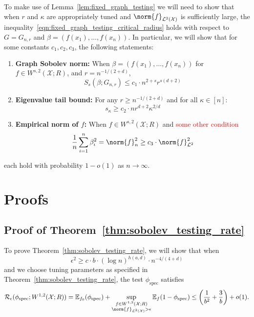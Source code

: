 \documentclass{article}
\newcommand{\1}{\mathbf{1}}
\newcommand{\Leb}{\mathcal{L}}
\newcommand{\Ebb}{\mathbb{E}}
\newcommand{\spec}{\mathrm{spec}}
\theoremstyle{alden}
\theoremstyle{aldenthm}
\theoremstyle{definition}
\theoremstyle{remark}
\begin{document}
To make use of Lemma~\ref{lem:fixed_graph_testing} we will need to show that when $r$ and $\kappa$ are appropriately tuned and $\norm{f}_{\Leb^2(\mathcal{X})}$ is sufficiently large, the inequality~\eqref{eqn:fixed_graph_testing_critical_radius} holds with respect to $G = G_{n,r}$ and $\beta = (f(x_1),\ldots,f(x_n))$. In particular, we will show that for some constants $c_1,c_2,c_3$, the following statements:
\begin{enumerate}[label=(E\arabic*)]
	\item 
	\label{event:higher_order_discrete_sobolev_norm}
	\textbf{Graph Sobolev norm:} When $\beta = (f(x_1),\ldots,f(x_n))$ for $f \in W^{s,2}(\mathcal{X};R)$, and $r = n^{-1/(2 + d)}$,
	\begin{equation}
	\label{eqn:higher_order_continuous_to_discrete_sobolev_norm}
	S_s(\beta;G_{n,r}) \leq c_1 \cdot n^{2 + s} r^{s(d + 2)} 
	\end{equation}
	\item 
	\label{event:higher_order_eigenvalue_tail_decay}
	\textbf{Eigenvalue tail bound:} For any $r \geq n^{-1/(2 + d)}$ and for all $\kappa \in [n]$:
	\begin{equation}
	\label{eqn:higher_ordereigenvalue_tail_bound}
	s_{\kappa} \geq c_2 \cdot n r^{d + 2} \kappa^{2/d}
	\end{equation}
	\item 
	\label{event:higher_order_l2_norm}
	\textbf{Empirical norm of $f$:} When $f \in W^{s,2}(\mathcal{X};R)$ and \textcolor{red}{some other condition}
	\begin{equation}
	\label{eqn:higher_order_l2_to_empirical_norm}
	\frac{1}{n}\sum_{i = 1}^{n}\beta_i^2 = \norm{f}_n^2 \geq c_3 \cdot \norm{f}_{\Leb^2}^2
	\end{equation}
\end{enumerate} 

each hold with probability $1 - o(1)$ as $n \to \infty$.



\section{Proofs}

\subsection{Proof of Theorem~\ref{thm:sobolev_testing_rate}}

To prove Theorem~\ref{thm:sobolev_testing_rate}, we will show that when
\begin{equation}
\label{eqn:critical_radius}
\epsilon^2 \geq c \cdot b \cdot (\log n)^{h(a,d)} \cdot n^{-4/(4 + d)}
\end{equation}
and we choose tuning parameters as specified in Theorem~\ref{thm:sobolev_testing_rate}, the test $\phi_{\mathrm{spec}}$ satisfies
\begin{equation}
\mathcal{R}_{\epsilon}(\phi_{\spec}; W^{1,2}(\mathcal{X};R)) = \Ebb_{f_0}(\phi_{\spec}) + \sup_{\substack{f \in W^{1,2}(\mathcal{X};R) \\ \norm{f}_{\Leb^2(\mathcal{X})} > \epsilon}} \Ebb_{f}(1 - \phi_{\spec}) \leq \left(\frac{1}{b^2} + \frac{3}{b}\right) + o(1).
\end{equation}
\end{document}
